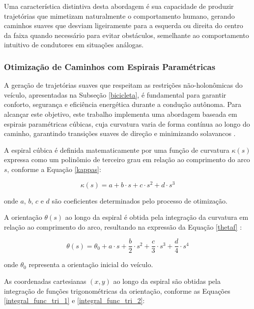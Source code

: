 Uma característica distintiva desta abordagem é sua capacidade de produzir trajetórias que mimetizam naturalmente o comportamento humano, gerando caminhos suaves que desviam ligeiramente para a esquerda ou direita do centro da faixa quando necessário para evitar obstáculos, semelhante ao comportamento intuitivo de condutores em situações análogas.

\subsubsection{Otimização de Caminhos com Espirais Paramétricas} \label{otimizacao_caminho}

A geração de trajetórias suaves que respeitam as restrições não-holonômicas do veículo, apresentadas na Subseção \ref{bicicleta}, é fundamental para garantir conforto, segurança e eficiência energética durante a condução autônoma. Para alcançar este objetivo, este trabalho implementa uma abordagem baseada em espirais paramétricas cúbicas, cuja curvatura varia de forma contínua ao longo do caminho, garantindo transições suaves de direção e minimizando solavancos \cite{University_of_Toronto2018-mp}.

A espiral cúbica é definida matematicamente por uma função de curvatura $\kappa(s)$ expressa como um polinômio de terceiro grau em relação ao comprimento do arco $s$, conforme a Equação \ref{kappas}:

\begin{equation} \label{kappas}
\kappa(s) = a + b \cdot s + c \cdot s^2 + d \cdot s^3
\end{equation}

onde $a$, $b$, $c$ e $d$ são coeficientes determinados pelo processo de otimização.

A orientação $\theta(s)$ ao longo da espiral é obtida pela integração da curvatura em relação ao comprimento do arco, resultando na expressão da Equação \ref{thetaf} \cite{University_of_Toronto2018-mp}:

\begin{equation} \label{thetaf}
\theta(s) = \theta_0 + a \cdot s + \frac{b}{2} \cdot s^2 + \frac{c}{3} \cdot s^3 + \frac{d}{4} \cdot s^4
\end{equation}

onde $\theta_0$ representa a orientação inicial do veículo.

As coordenadas cartesianas $(x,y)$ ao longo da espiral são obtidas pela integração de funções trigonométricas da orientação, conforme as Equações \ref{integral_func_tri_1} e \ref{integral_func_tri_2}:

